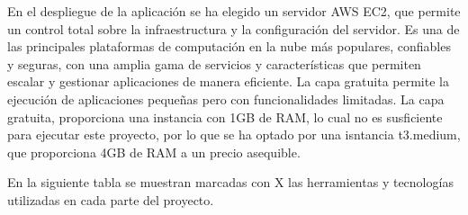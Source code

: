En el despliegue de la aplicación se ha elegido un servidor AWS EC2, que permite un control total sobre la infraestructura y la configuración del servidor. Es una de las principales plataformas de computación en la nube más populares, confiables y seguras, con una amplia gama de servicios y características que permiten escalar y gestionar aplicaciones de manera eficiente. La capa gratuita permite la ejecución de aplicaciones pequeñas pero con funcionalidades limitadas. La capa gratuita, proporciona una instancia con 1GB de RAM, lo cual no es susficiente para ejecutar este proyecto, por lo que se ha optado por una isntancia t3.medium, que proporciona 4GB de RAM a un precio asequible.

En la siguiente tabla se muestran marcadas con X las herramientas y tecnologías utilizadas en cada parte del proyecto. 


